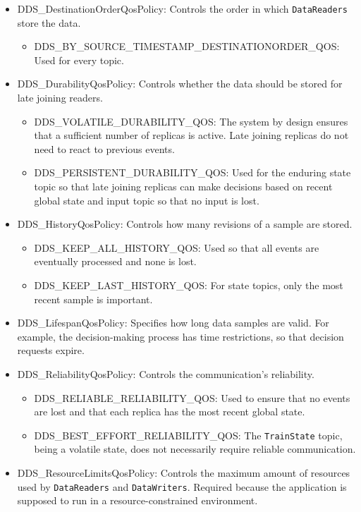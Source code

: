 \begin{itemize}
\item DDS\_DestinationOrderQosPolicy: Controls the order in which \texttt{DataReaders} store the data.
	\begin{itemize}
	\item DDS\_BY\_SOURCE\_TIMESTAMP\_DESTINATIONORDER\_QOS: Used for every topic.
	\end{itemize}
\item DDS\_DurabilityQosPolicy: Controls whether the data should be stored for late joining readers.
	\begin{itemize}
	\item DDS\_VOLATILE\_DURABILITY\_QOS: The system by design ensures that a sufficient number of replicas is active. Late joining replicas do not need to react to previous events.
	\item DDS\_PERSISTENT\_DURABILITY\_QOS: Used for the enduring state topic so that late joining replicas can make decisions based on recent global state and input topic so that no input is lost.
	\end{itemize}
\item DDS\_HistoryQosPolicy: Controls how many revisions of a sample are stored.
	\begin{itemize}
	\item DDS\_KEEP\_ALL\_HISTORY\_QOS: Used so that all events are eventually processed and none is lost.
	\item DDS\_KEEP\_LAST\_HISTORY\_QOS: For state topics, only the most recent sample is important.
	\end{itemize}
\item DDS\_LifespanQosPolicy: Specifies how long data samples are valid. For example, the decision-making process has time restrictions, so that decision requests expire.
\item DDS\_ReliabilityQosPolicy: Controls the communication's reliability.
	\begin{itemize}
	\item DDS\_RELIABLE\_RELIABILITY\_QOS: Used to ensure that no events are lost and that each replica has the most recent global state.
	\item DDS\_BEST\_EFFORT\_RELIABILITY\_QOS: The \texttt{TrainState} topic, being a volatile state, does not necessarily require reliable communication.
	\end{itemize}
\item DDS\_ResourceLimitsQosPolicy: Controls the maximum amount of resources used by \texttt{DataReaders} and \texttt{DataWriters}. Required because the application is supposed to run in a resource-constrained environment.
\end{itemize}


